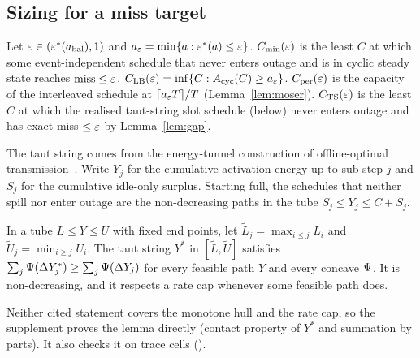 \subsection{Sizing for a miss target}\label{sec:sandwich}
\begin{definition}\label{def:sizing}
Let $\varepsilon\in(\varepsilon^*(a_{\mathrm{bal}}),1)$ and $a_\varepsilon=\min\{a:\varepsilon^*(a)\le\varepsilon\}$. $C_{\min}(\varepsilon)$ is the least $C$ at which some event-independent schedule that never enters outage and is in cyclic steady state reaches $\mathrm{miss}\le\varepsilon$. $C_{\mathrm{LB}}(\varepsilon)=\inf\{C:A_{\mathrm{cyc}}(C)\ge a_\varepsilon\}$. $C_{\mathrm{per}}(\varepsilon)$ is the capacity of the interleaved schedule at $\lceil a_\varepsilon T\rceil/T$ (Lemma~\ref{lem:moser}). $C_{\mathrm{TS}}(\varepsilon)$ is the least $C$ at which the realised taut-string slot schedule (below) never enters outage and has exact miss $\le\varepsilon$ by Lemma~\ref{lem:gap}.
\end{definition}
\noindent The taut string comes from the energy-tunnel construction of offline-optimal transmission~\cite{tutuncuoglu2012twc,yang2012tcom}. Write $Y_j$ for the cumulative activation energy up to sub-step $j$ and $S_j$ for the cumulative idle-only surplus. Starting full, the schedules that neither spill nor enter outage are the non-decreasing paths in the tube $S_j\le Y_j\le C+S_j$.
\begin{lemma}\label{lem:taut}
In a tube $L\le Y\le U$ with fixed end points, let $\tilde L_j=\max_{i\le j}L_i$ and $\tilde U_j=\min_{i\ge j}U_i$. The taut string $Y^*$ in $[\tilde L,\tilde U]$ satisfies $\sum_j\Psi(\Delta Y^*_j)\ge\sum_j\Psi(\Delta Y_j)$ for every feasible path $Y$ and every concave $\Psi$. It is non-decreasing, and it respects a rate cap whenever some feasible path does.
\end{lemma}
\noindent Neither cited statement covers the monotone hull and the rate cap, so the supplement proves the lemma directly (contact property of $Y^*$ and summation by parts). It also checks it on \LfourN{} trace cells (\LfourOK).


